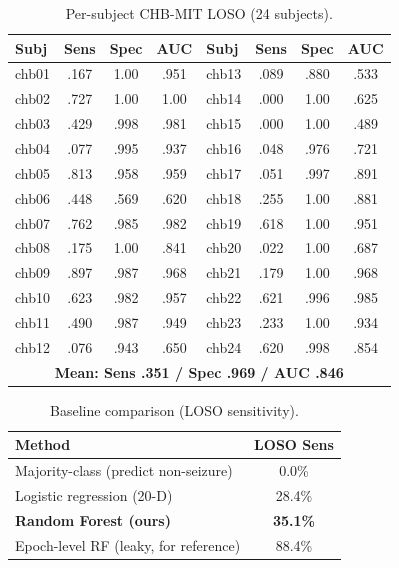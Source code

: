 \documentclass[10pt,journal,twocolumn]{IEEEtran}
\begin{document}
\begin{table}[t]\centering\caption{Per-subject CHB-MIT LOSO (24 subjects).}\label{tab:full}
\footnotesize\begin{tabular}{lccc|lccc}\toprule
Subj & Sens & Spec & AUC & Subj & Sens & Spec & AUC\\\midrule
chb01&.167&1.00&.951 & chb13&.089&.880&.533\\
chb02&.727&1.00&1.00 & chb14&.000&1.00&.625\\
chb03&.429&.998&.981 & chb15&.000&1.00&.489\\
chb04&.077&.995&.937 & chb16&.048&.976&.721\\
chb05&.813&.958&.959 & chb17&.051&.997&.891\\
chb06&.448&.569&.620 & chb18&.255&1.00&.881\\
chb07&.762&.985&.982 & chb19&.618&1.00&.951\\
chb08&.175&1.00&.841 & chb20&.022&1.00&.687\\
chb09&.897&.987&.968 & chb21&.179&1.00&.968\\
chb10&.623&.982&.957 & chb22&.621&.996&.985\\
chb11&.490&.987&.949 & chb23&.233&1.00&.934\\
chb12&.076&.943&.650 & chb24&.620&.998&.854\\\midrule
\multicolumn{8}{c}{\textbf{Mean: Sens .351 / Spec .969 / AUC .846}}\\\bottomrule
\end{tabular}\end{table}

\begin{table}[t]\centering\caption{Baseline comparison (LOSO sensitivity).}\label{tab:base}
\begin{tabular}{lc}\toprule
Method & LOSO Sens\\\midrule
Majority-class (predict non-seizure) & 0.0\%\\
Logistic regression (20-D) & 28.4\%\\
\textbf{Random Forest (ours)} & \textbf{35.1\%}\\
Epoch-level RF (leaky, for reference) & 88.4\%\\\bottomrule
\end{tabular}\end{table}
\end{document}
